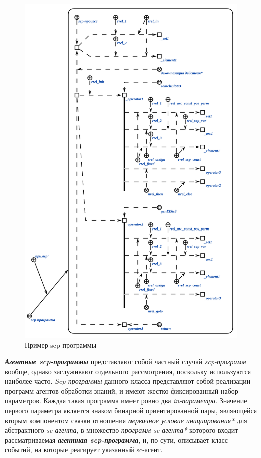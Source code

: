 \begin{figure}[H]
	\centering
	\includegraphics[scale=0.8]{images/part3/chapter_situation_management/program_example.png}
	\caption{Пример scp-программы}
	\label{fig:program_example}
\end{figure}

\textbf{\textit{Агентные scp-программы}} представляют собой частный случай \textit{scp-программ} вообще, однако заслуживают отдельного рассмотрения, поскольку используются наиболее часто. \textit{Scp-программы} данного класса представляют собой реализации программ агентов обработки знаний, и имеют жестко фиксированный набор параметров. Каждая такая программа имеет ровно два \textit{in-параметра\scnrolesign}. Значение первого параметра является знаком бинарной ориентированной пары, являющейся вторым компонентом связки отношения \textit{первичное условие инициирования*} для абстрактного \textit{sc-агента}, в множество \textit{программ sc-агента*} которого входит рассматриваемая \textbf{\textit{агентная scp-программа}}, и, по сути, описывает класс событий, на которые реагирует указанный sc-агент.
	
